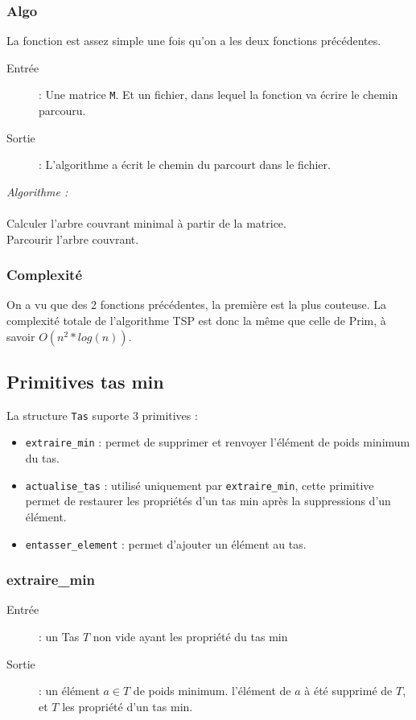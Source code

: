 \documentclass[a4paper,11pt]{article}
\begin{document}
\subsubsection*{Algo}
La fonction est assez simple une fois qu'on a les deux fonctions précédentes.
\begin{description}
\item[Entrée] : Une matrice \texttt{M}. Et un fichier, dans lequel la fonction va écrire le chemin parcouru.
\item[Sortie] : L'algorithme a écrit le chemin du parcourt dans le fichier.\\
\end{description}

\textit{Algorithme : }\\
\\
Calculer l'arbre couvrant minimal à partir de la matrice.\\
Parcourir l'arbre couvrant.\\

\subsubsection*{Complexité}
On a vu que des 2 fonctions précédentes, la première est la plus couteuse.
La complexité totale de l'algorithme TSP est donc la même que celle de Prim, à savoir $O(n^2*log(n))$.

\subsection{Primitives tas min} %
La structure \texttt{Tas} suporte 3 primitives :
\begin{itemize}
\item \texttt{extraire\_min} : permet de supprimer et renvoyer l’élément de poids minimum du tas.
\item \texttt{actualise\_tas} : utilisé uniquement par \texttt{extraire\_min}, cette primitive permet de restaurer les propriétés d'un tas min après la suppressions d'un élément.
\item \texttt{entasser\_element} : permet d'ajouter un élément au tas.
\end{itemize}
\subsubsection*{extraire\_min}
\begin{description}
\item[Entrée] : un \textsf{Tas} $T$ non vide ayant les propriété du tas min
\item[Sortie] : un élément $a \in T$ de poids minimum. l'élément de $a$ à été supprimé de $T$, et $T$ les propriété d'un tas min.
\end{description}
\end{document}
